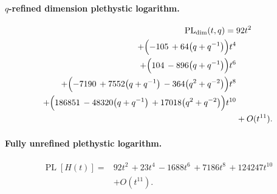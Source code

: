 \documentclass[10pt]{article}
\begin{document}
\paragraph{$q$-refined dimension plethystic logarithm.}
\[
\begin{aligned}
\operatorname{PL}_{\mathrm{dim}}(t,q) ={}&
   92t^{2} \\
  + \Bigl(-105\,+64\bigl(q+q^{-1}\bigr)\Bigr)t^{4} \\
  + \Bigl(104\,-896\bigl(q+q^{-1}\bigr)\Bigr)t^{6} \\
  + \Bigl(-7190\,+7552\bigl(q+q^{-1}\bigr)\,-364\bigl(q^{2}+q^{-2}\bigr)\Bigr)t^{8} \\
  + \Bigl(186851\,-48320\bigl(q+q^{-1}\bigr)\,+17018\bigl(q^{2}+q^{-2}\bigr)\Bigr)t^{10} \\
  &+ O(t^{11}).
\end{aligned}
\]
\paragraph{Fully unrefined plethystic logarithm.}
\[
\begin{aligned}
\operatorname{PL}[H(t)] ={}& 92t^{2}\,+23t^{4}\,-1688t^{6}\,+7186t^{8}\,+124247t^{10} \\
  &+ O(t^{11}).
\end{aligned}
\]
\end{document}
